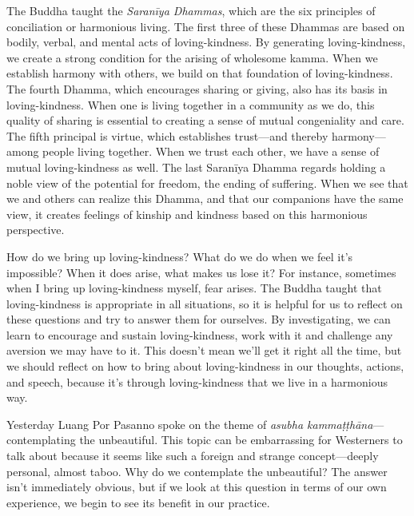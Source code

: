 
The Buddha taught the \emph{Saranīya Dhammas}, which are the six 
principles of conciliation or harmonious living. The first three of 
these Dhammas are based on bodily, verbal, and mental acts of 
loving-kindness. By generating loving-kindness, we create a strong 
condition for the arising of wholesome kamma. When we establish harmony 
with others, we build on that foundation of loving-kindness. The fourth 
Dhamma, which encourages sharing or giving, also has its basis in 
loving-kindness. When one is living together in a community as we do, 
this quality of sharing is essential to creating a sense of mutual 
congeniality and care. The fifth principal is virtue, which establishes 
trust---and thereby harmony---among people living together. When we 
trust each other, we have a sense of mutual loving-kindness as well. 
The last Saranīya Dhamma regards holding a noble view of the potential 
for freedom, the ending of suffering. When we see that we and others 
can realize this Dhamma, and that our companions have the same view, it 
creates feelings of kinship and kindness based on this harmonious 
perspective.

How do we bring up loving-kindness? What do we do when we feel it's 
impossible? When it does arise, what makes us lose it? For instance, 
sometimes when I bring up loving-kindness myself, fear arises. The 
Buddha taught that loving-kindness is appropriate in all situations, so 
it is helpful for us to reflect on these questions and try to answer 
them for ourselves. By investigating, we can learn to encourage and 
sustain loving-kindness, work with it and challenge any aversion we may 
have to it. This doesn't mean we'll get it right all the time, but we 
should reflect on how to bring about loving-kindness in our thoughts, 
actions, and speech, because it's through loving-kindness that we live 
in a harmonious way.


Yesterday Luang Por Pasanno spoke on the theme of \emph{asubha 
kammaṭṭhāna}---contemplating the unbeautiful. This topic can be 
embarrassing for Westerners to talk about because it seems like such a 
foreign and strange concept---deeply personal, almost taboo. Why do we 
contemplate the unbeautiful? The answer isn't immediately obvious, but 
if we look at this question in terms of our own experience, we begin to 
see its benefit in our practice.

